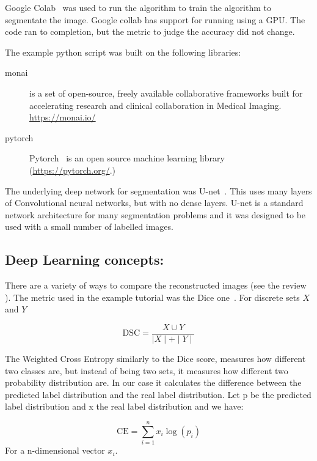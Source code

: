 \documentclass[12pt]{article}
\begin{document}
Google Colab~\cite{bisong2019google} was used to run the algorithm
to train the algorithm to segmentate the image. Google collab
has support for running using a GPU. The code ran to completion,
but the metric to judge the accuracy did not change.


The example python script was built on the following libraries:

\begin{description}

  \item[monai] is a set of open-source, freely available collaborative frameworks built for accelerating research and clinical collaboration in Medical Imaging.  \url{https://monai.io/}

\item[pytorch] Pytorch~\cite{paszke2019pytorch}
  is an open source machine learning library  (\url{https://pytorch.org/}.)
    
\end{description}

The underlying deep network for segmentation was
U-net~\cite{ronneberger2015u}.  This uses many layers of Convolutional
neural networks, but with no dense layers.  U-net is a standard
network architecture for many segmentation problems and it was
designed to be used with a small number of labelled images.


\subsection{Deep Learning concepts:}

There are a variety of ways to compare the reconstructed images (see
the review~\cite{taha2015metrics} ).  The metric used in the example
tutorial was the Dice one~\cite{zijdenbos1994morphometric}.
For discrete sets $X$ and $Y$ 

\begin{equation}
\mbox{DSC} = \frac{X \cup  Y} {\mid X \mid + \mid Y \mid }
\end{equation}
  
The Weighted Cross Entropy  similarly to the Dice score,
measures how different two classes are, but instead of being two sets,
it measures how different two probability distribution are. In our
case it calculates the difference between the predicted label
distribution and the real label distribution. Let p be the predicted
label distribution and x the real label distribution and we have:

\begin{equation}
\mbox{CE} = \sum_{i=1}^{n} x_i \log(p_i)
\end{equation}
For a n-dimensional vector $x_i$.
\end{document}
